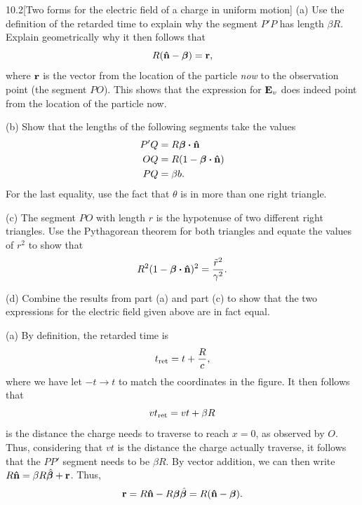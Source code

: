 \documentclass[12pt]{article}
\begin{document}
\begin{problem}{10.2}[Two forms for the electric field of a charge in uniform
    motion]
(a) Use the definition of the retarded time to explain why the segment $P'P$ has
length $\beta R$. Explain geometrically why it then follows that
\begin{equation}
    R(\vb{\hat{n}}-\bm\beta)=\vb{r}, 
\end{equation}
where $\vb{r}$ is the vector from the location of the particle \textit{now} to
the observation point (the segment $PO$). This shows that the expression for
$\vb{E}_v$ does indeed point from the location of the particle now.

(b) Show that the lengths of the following segments take the values
\begin{align}
    P'Q&=R\bm\beta\vdot\nhat\notag\\
    OQ&=R(1-\bm\beta\vdot\nhat)\\
    PQ&=\beta b.\notag
\end{align}
For the last equality, use the fact that $\theta$ is in more than one right
triangle.

(c) The segment $PO$ with length $r$ is the hypotenuse of two different right
triangles. Use the Pythagorean theorem for both triangles and equate the values
of $r^2$ to show that
\begin{equation}
    R^2(1-\bm\beta\vdot\nhat)^2=\frac{\tilde{r}^2}{\gamma^2}. 
\end{equation}

(d) Combine the results from part (a) and part (c) to show that the two
expressions for the electric field given above are in fact equal.
\begin{solution}
(a) By definition, the retarded time is
\begin{equation}
    t_{\text{ret}}=t+\frac{R}{c}, 
\end{equation}
where we have let $-t\to t$ to match the coordinates in the figure. It then
follows that
\begin{equation}
    vt_{\text{ret}}=vt+\beta R
\end{equation}
is the distance the charge needs to traverse to reach $x=0$, as observed by $O$.
Thus, considering that $vt$ is the distance the charge actually traverse, it
follows that the $PP'$ segment needs to be $\beta R$. By vector addition, we can
then write $R\vb{\hat{n}}=\beta R\hat{\bm\beta}+\vb{r}$. Thus,
\begin{equation}\label{p2a:r}
    \vb{r}=R\vb{\hat{n}}-R\bm\beta\hat{\bm\beta}=R(\vb{\hat{n}}-\bm\beta). 
\end{equation}


\end{solution}
\end{problem}
\end{document}
